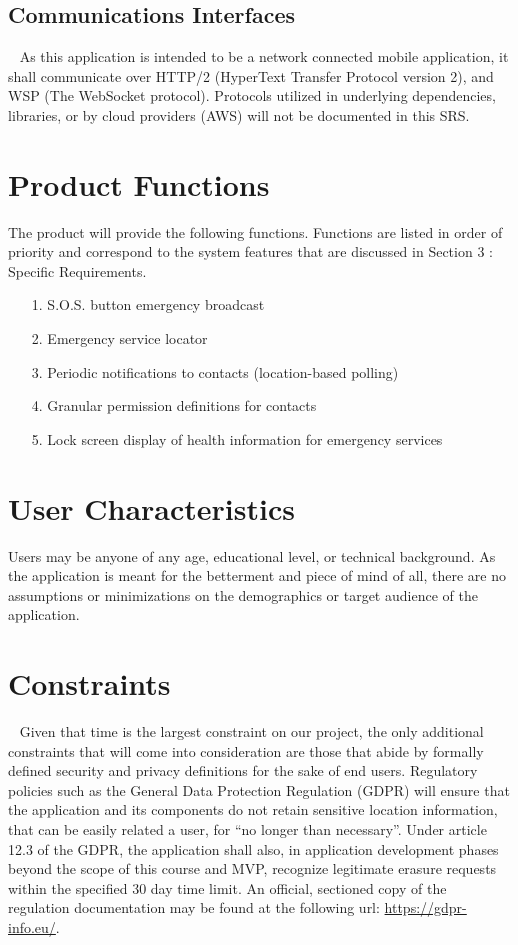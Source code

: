 \documentclass{scrreprt}
\begin{document}
\subsection{Communications Interfaces}
\par ~ As this application is intended to be a network connected mobile application, it shall communicate over HTTP/2 (HyperText Transfer Protocol version 2), and WSP (The WebSocket protocol). Protocols utilized in underlying dependencies, libraries, or by cloud providers (AWS) will not be documented in this SRS.


\section{Product Functions}
The product will provide the following functions. Functions are listed in order of priority and correspond to the system features that are discussed in Section 3 : Specific Requirements. \begin{enumerate}
	\item[1.] S.O.S. button emergency broadcast
	\item[2.] Emergency service locator
	\item[3.] Periodic notifications to contacts (location-based polling)
	\item[4.] Granular permission definitions for contacts
	\item[5.] Lock screen display of health information for emergency services
\end{enumerate}


\section{User Characteristics}
Users may be anyone of any age, educational level, or technical background. As the application is meant for the betterment and piece of mind of all, there are no assumptions or minimizations on the demographics or target audience of the application.


\section{Constraints}
\par ~ Given that time is the largest constraint on our project, the only additional constraints that will come into consideration are those that abide by formally defined security and privacy definitions for the sake of end users. Regulatory policies such as the General Data Protection Regulation (GDPR) will ensure that the application and its components do not retain sensitive location information, that can be easily related a user, for ``no longer than necessary''. Under article 12.3 of the GDPR, the application shall also, in application development phases beyond the scope of this course and MVP, recognize legitimate erasure requests within the specified 30 day time limit. An official, sectioned copy of the regulation documentation may be found at the following url: \url{https://gdpr-info.eu/}.
\end{document}

